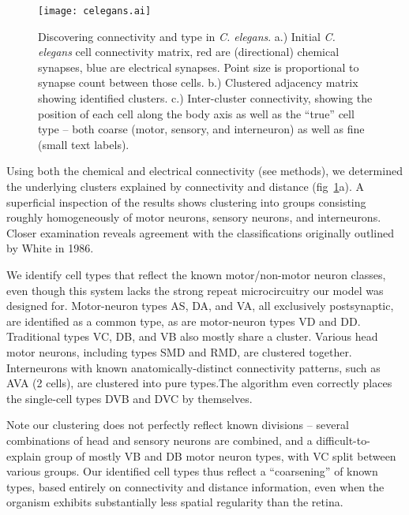 \documentclass{article}
\begin{document}
\begin{figure}
  \centering 
  \centerline{\texttt{[image: celegans.ai]}}
  \caption{Discovering connectivity and type in \textit{C. elegans}. 
 a.) Initial
    \textit{C. elegans} cell connectivity matrix, red are
    (directional) chemical synapses, blue are electrical
    synapses. Point size is proportional to synapse count between
    those cells. b.) Clustered adjacency matrix showing identified
    clusters. c.) Inter-cluster connectivity, showing the position of
    each cell along the body axis as well as the ``true'' cell type --
    both coarse (motor, sensory, and interneuron) as well as fine
    (small text labels). }
  \label{fig:celegans}
\end{figure}



Using both the chemical and electrical connectivity (see methods), we
determined the underlying clusters explained by connectivity and
distance (fig~\ref{fig:celegans}a). A superficial inspection of the results shows
clustering into groups consisting roughly homogeneously of motor
neurons, sensory neurons, and interneurons. Closer examination reveals
agreement with the classifications originally outlined by White in
1986.  

We identify cell types that reflect the known motor/non-motor neuron
classes, even though this system lacks the strong repeat
microcircuitry our model was designed for.  Motor-neuron types AS, DA,
and VA, all exclusively postsynaptic, are identified as a common type,
as are motor-neuron types VD and DD. Traditional types VC, DB, and VB
also mostly share a cluster. Various head motor neurons, including
types SMD and RMD, are clustered together. Interneurons with known
anatomically-distinct connectivity patterns, such as AVA (2 cells),
are clustered into pure types.The algorithm even correctly places the
single-cell types DVB and DVC by themselves.

Note our clustering does not perfectly reflect known divisions --
several combinations of head and sensory neurons are combined, and a
difficult-to-explain group of mostly VB and DB motor neuron types,
with VC split between various groups. Our identified cell types thus
reflect a ``coarsening'' of known types, based entirely on
connectivity and distance information, even when the organism exhibits
substantially less spatial regularity than the retina.
\end{document}
